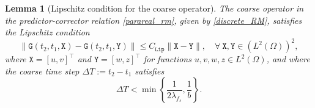 \documentclass[11pt]{article}
\newtheorem{lemma}[theorem]{Lemma}
\begin{document}
\begin{lemma}[Lipschitz condition for the coarse operator]\label{Lipschitz_c_op_ct}
The coarse operator in the predictor-corrector relation \eqref{parareal_rm}, given by \eqref{discrete_RM}, satisfies the Lipschitz condition 
\[
\| \mathtt{G}(t_2, t_1, \mathtt{X}) - \mathtt{G}(t_2, t_1, \mathtt{Y}) \| \leq C_{\texttt{Lip}} \| \mathtt{X} - \mathtt{Y} \|, \quad \forall ~ \mathtt{X}, \mathtt{Y} \in \left(L^2(\Omega)\right)^2,
\]
where $\mathtt{X} = [u, v]^{\top}$ and $\mathtt{Y} = [w, z]^{\top}$ for functions $u, v, w, z \in L^2(\Omega)$, and where the coarse time step $\Delta T := t_2 - t_1$ satisfies 
\begin{equation}\label{coarse_time_step}
\Delta T < \min\left\{ \frac{1}{2\lambda_{f_s}}, \frac{1}{b} \right\}.
\end{equation}
\end{lemma}
\end{document}

